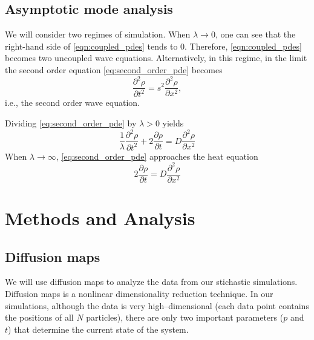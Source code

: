 \documentclass[prl,reprint]{revtex4-1}
\begin{document}
\subsection{Asymptotic mode analysis}  \label{subsec:mode_analysis}

We will consider two regimes of simulation.
%
When $\lambda \rightarrow 0$, one can see that the right-hand side of \eqref{eqn:coupled_pdes} tends to 0. 
%
Therefore, \eqref{eqn:coupled_pdes} becomes two uncoupled wave equations.
%
Alternatively, in this regime, in the limit the second order equation \eqref{eq:second_order_pde} becomes 
\[
\frac{\partial^2 \rho}{\partial t^2} = s^2 \frac{\partial ^2 \rho}{\partial x^2},
\]
i.e., the second order wave equation.

Dividing \eqref{eq:second_order_pde} by $\lambda > 0$ yields
\[
\frac{1}{\lambda} \frac{\partial^2 \rho}{\partial t^2} + 2 \frac{\partial \rho}{\partial t} = D \frac{\partial ^2 \rho}{\partial x^2}
\]
When $\lambda \rightarrow \infty$, \eqref{eq:second_order_pde} approaches the heat equation
\[
2 \frac{\partial \rho}{\partial t} = D \frac{\partial ^2 \rho}{\partial x^2}
\]
 
\section{Methods and Analysis}

\subsection{Diffusion maps}

We will use diffusion maps \cite{coifman2005geometric} to analyze the data from our stichastic simulations.
%
Diffusion maps is a nonlinear dimensionality reduction technique.
%
In our simulations, although the data is very high--dimensional (each data point contains the positions of all $N$ particles), there are only two important parameters ($p$ and $t$) that determine the current state of the system.
\end{document}
